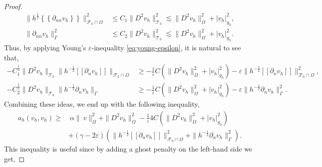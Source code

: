 \documentclass[11pt]{article}
\theoremstyle{remark}
\newcommand{\mean}[1]{\left\{\!\!\left\{#1\right\}\!\!\right\}}
\newcommand{\jump}[1]{\left[\!\left[ #1 \right]\!\right]}
\newcommand{\abs}[1]{\left\lvert #1 \right\rvert}
\renewcommand{\le}{\leqslant}
\renewcommand{\ge}{\geqslant}
\numberwithin{equation}{section}
\begin{document}
\begin{proof}
    \begin{equation}
        \begin{split}
     \| h^{\frac{1}{2}} \mean{ \partial _{nn}v_{h} } \|_{ \mathcal{F}_{h} \cap \Omega    }^{  2} & \le C_{1} \| D^2 v_{h} \|_{ \mathcal{T}_{h}   }^{2  } \lesssim   \| D^2 v_{h} \|_{ \Omega  }^{ 2 }  + \abs{ v_{h} } _{ g_{h} }^{2  },   \\
     \|  \partial _{nn}v_{h}  \|_{ \Gamma     }^{ 2 } & \le C_{2} \| D^2 v_{h} \|_{ \mathcal{T} _{h}  }^{2  } \lesssim    \| D^2 v_{h} \|_{ \Omega  }^{ 2 }  + \abs{ v_{h} } _{ g_{h} }^{2  }.
        \end{split}
    \end{equation}
    Thus, by applying Young's $\varepsilon $-inequality \eqref{eq:young-epsilon}, it is natural to see that,
    \begin{equation}
        \begin{split}
- C_{1}^{\frac{1}{2}} \| D^2 v_{h}    \|_{ \mathcal{T} _{h}   }^{  }  \|h^{-\frac{1}{2}} \jump{ \partial _{n} v_{h} }   \|_{ \mathcal{F}^{}_{h}\cap \Omega   }^{  }
& \ge - \frac{1}{\varepsilon } C  (\| D^2 v_{h} \|_{ \Omega  }^{ 2 }  + \abs{ v_{h} } _{ g_{h} }^{2  } ) -  \varepsilon \|h^{-\frac{1}{2}} \jump{ \partial _{n} v_{h} }   \|_{ \mathcal{F}^{}_{h}\cap \Omega   }^{2  }, \\
- C_{2}^{\frac{1}{2}}  \| D^2 v_{h} \|_{ \mathcal{T} _{h} }^{  } \| h^{-\frac{1}{2}}  \partial _{n} v_{h}    \|_{ \Gamma    }^{  }
& \ge - \frac{1}{\varepsilon } C  (\| D^2 v_{h} \|_{ \Omega  }^{ 2 }  + \abs{ v_{h} } _{ g_{h} }^{2  } ) -  \varepsilon \|h^{-\frac{1}{2}}  \partial _{n} v_{h}    \|_{ \Gamma    }^{2  }.
        \end{split}
    \end{equation}
    Combining these ideas, we end up with the following inequality,
    \begin{equation}
    \begin{split}
       a_{h}( v_{h},v_{h})  \ge& \  \alpha     \|\  v  \|_{   \Omega   }^{2} +\| D^2v_{h}  \|_{   \Omega   }^{2} -  \frac{1}{\varepsilon } 4C  (\| D^2 v_{h} \|_{ \Omega  }^{ 2 }  + \abs{ v_{h} } _{ g_{h} }^{2  } )  \\
                       & + (\gamma - 2\varepsilon  )\left( \|h^{-\frac{1}{2}}  \jump{ \partial _{n} v_{h} }\|_{\mathcal{F} _{h}^{} \cap \Omega   }^{ 2 } + \| h^{-\frac{1}{2}} \partial _{n} v_{h} \|_{ \Gamma  }^{ 2} \right).
    \end{split}
    \end{equation}
    This inequality is useful since by adding a ghost penalty on the left-hand side we get,

\end{proof}
\end{document}
